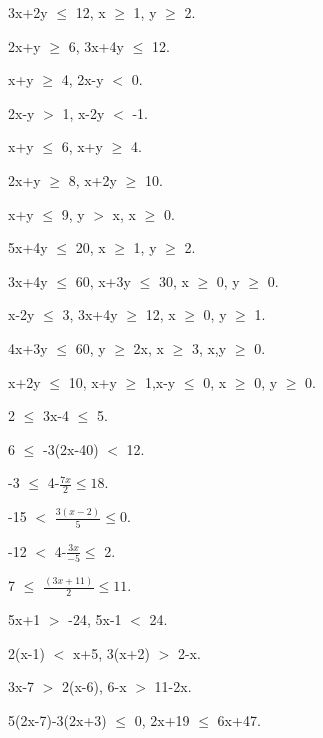     \item 3x+2y $\leq$ 12, x $\geq$ 1, y $\geq$ 2.
    \item 2x+y $\geq$ 6, 3x+4y $\leq$ 12.
    \\
    \solution
    

    
    \item x+y $\geq$ 4, 2x-y $<$ 0.
    \item 2x-y $>$ 1, x-2y $<$ -1.
    \\
    \solution
    

    \item x+y $\leq$ 6, x+y $\geq$ 4.
    \\
    \solution
    
    \item 2x+y $\geq$ 8, x+2y $\geq$ 10.
    \\
    \solution
    
    
    \item x+y $\leq$ 9, y $>$ x, x $\geq$ 0.
    \item 5x+4y $\leq$ 20, x $\geq$ 1, y $\geq$ 2.
    \item 3x+4y $\leq$ 60, x+3y $\leq$ 30, x $\geq$ 0, y $\geq$ 0.
    \\
    \solution
    
    
    \item x-2y $\leq$ 3, 3x+4y $\geq$ 12, x $\geq$ 0, y $\geq$ 1.
    \\
    \solution
    
    
    \item 4x+3y $\leq$ 60, y $\geq$ 2x, x $\geq$ 3, x,y $\geq$ 0.
    \\
    \solution
    
    \item x+2y $\leq$ 10, x+y $\geq$ 1,x-y $\leq$ 0, x $\geq$ 0, 
    y $\geq$ 0.
    
 
    \item 2 $\leq$ 3x-4 $\leq$ 5.
    \item 6 $\leq$ -3(2x-40)  $<$ 12.
    \item -3 $\leq$ 4-$\frac{7x}{2} \leq 18$. 
    \item -15 $<$ $\frac{3(x-2)}{5} \leq 0$.
    \item -12 $<$ 4-$\frac{3x}{-5} \leq$ 2.
    \item 7 $\leq$ $\frac{(3x+11)}{2} \leq 11$.
    
    \item 5x+1 $>$ -24, 5x-1 $<$ 24.
    \item 2(x-1) $<$ x+5, 3(x+2) $>$ 2-x.
    \item 3x-7 $>$ 2(x-6), 6-x $>$ 11-2x.
    \item 5(2x-7)-3(2x+3) $\leq$ 0, 2x+19 $\leq$ 6x+47.
    
